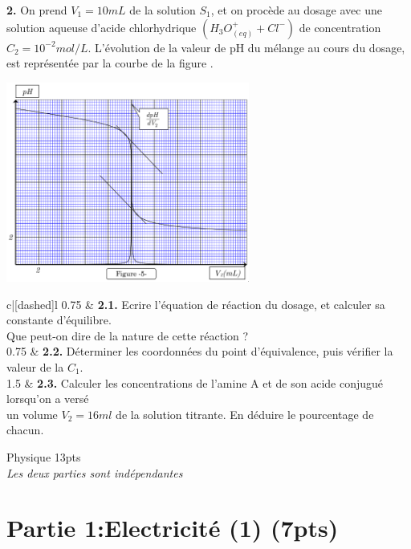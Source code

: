 \documentclass[12pt]{article}
\begin{document}
\textbf{2.} On prend $V_1=10mL$ de la solution $S_1$, et on procède au dosage avec une solution
aqueuse d’acide chlorhydrique $(H_3O^+_{(eq)} + Cl^-)$ de concentration $C_2=10^{-2} mol/L$.
L’évolution de la valeur de pH du mélange au cours du dosage, est représentée par la
courbe de la figure .

\begin{center}
  \includegraphics[width=0.6\textwidth]{./img/chimie00.png}
\end{center}


\begin{tblr}{c|[dashed]l}
	0.75  & {\textbf{2.1. }Ecrire l’équation de réaction du dosage, et calculer sa constante d’équilibre.
\\Que peut-on dire de la nature de cette réaction ? } \\
	0.75  & {\textbf{2.2. }Déterminer les coordonnées du point d’équivalence, puis vérifier la valeur de la
$C_1$. }\\
	1.5  & {\textbf{2.3. }Calculer les concentrations de l’amine A et de son acide conjugué lorsqu’on a
versé \\un volume $V_2=16ml$ de la solution titrante. En déduire le pourcentage de
chacun. } \\
\end{tblr}
\begin{center}
\hrulefill
\Large{Physique 13pts}
\hrulefill\\
    \emph{Les deux parties sont indépendantes}
\end{center}


\section*{Partie 1:Electricité (1) \dotfill(7pts) }
\end{document}
